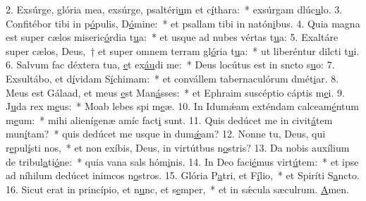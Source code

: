 2. Exsúrge, glória mea, exsúrge, psaltéri\uline{u}m et c\uline{í}thara:~* exsúrgam dlúc\uline{u}lo.
3. Confitébor tibi in p\uline{ó}pulis, D\uline{ó}mine:~* et psallam tibi in natón\uline{i}bus.
4. Quia magna est super cælos miseric\uline{ó}rdia t\uline{u}a:~* et usque ad nubes vértas t\uline{u}a:
5. Exaltáre super cælos, Deus,~† et super omnem terram gl\uline{ó}ria t\uline{u}a:~* ut liberéntur dilcti t\uline{u}i.
6. Salvum fac déxtera tua, \uline{e}t ex\uline{áu}di me:~* Deus locútus est in sncto s\uline{u}o:
7. Exsultábo, et d\uline{í}vidam S\uline{í}chimam:~* et convállem tabernaculórum dmét\uline{i}ar.
8. Meus est Gálaad, et meus \uline{e}st Man\uline{á}sses:~* et Ephraim suscéptio cáptis m\uline{e}i.
9. J\uline{u}da rex m\uline{e}us:~* Moab lebes spi m\uline{e}æ.
10. In Idumǽam exténdam calceam\uline{é}ntum m\uline{e}um:~* mihi alienígenæ amíc fact\uline{i} sunt.
11. Quis dedúcet me in civit\uline{á}tem mun\uline{í}tam?~* quis dedúcet me usque in dum\uline{ǽ}am?
12. Nonne tu, Deus, qui r\uline{e}pul\uline{í}sti nos,~* et non exíbis, Deus, in virtútbus n\uline{o}stris?
13. Da nobis auxílium de tribul\uline{a}ti\uline{ó}ne:~* quia vana sals hóm\uline{i}nis.
14. In Deo faci\uline{é}mus virt\uline{ú}tem:~* et ipse ad níhilum dedúcet inimcos n\uline{o}stros.
15. Glória P\uline{a}tri, et F\uline{í}lio,~* et Spiríti S\uline{a}ncto.
16. Sicut erat in princípio, et n\uline{u}nc, et s\uline{e}mper,~* et in sǽcula sæculrum. \uline{A}men.
